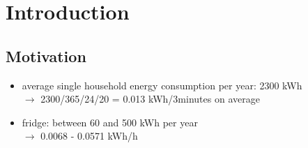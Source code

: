 
\section{Introduction}\label{Sec:Intro}




\subsection{Motivation}\label{Sec:Intro;Subsec:Motivation}

\begin{itemize}
    \item average single household energy consumption per year: 2300 kWh \\
    $\xrightarrow{}$ 2300/365/24/20 = 0.013 kWh/3minutes on average
    \item fridge: between 60 and 500 kWh per year\\
    $\xrightarrow{}$ 0.0068 - 0.0571 kWh/h
\end{itemize}

